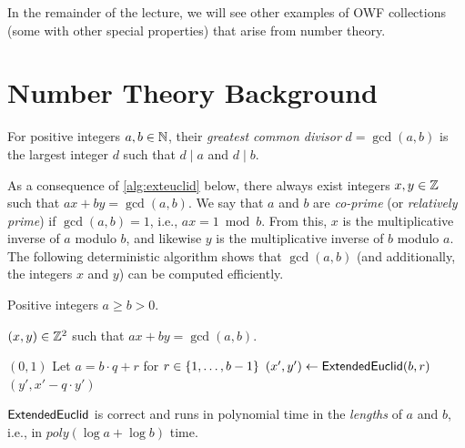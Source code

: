 \documentclass[11pt]{article}
\begin{document}
In the remainder of the lecture, we will see other examples of OWF
collections (some with other special properties) that arise from
number theory.

\section{Number Theory Background}
\label{sec:numb-theory-backgr}

\begin{definition}
   \label{def:gcd}
   For positive integers $a,b \in \mathbb{N}$, their \emph{greatest common
     divisor} $d = \gcd(a,b)$ is the largest integer $d$ such that $d
   \mid a$ and $d \mid b$.
\end{definition}

As a consequence of \cref{alg:exteuclid} below, there always
exist integers $x,y \in \mathbb{Z}$ such that $ax + by = \gcd(a,b)$.  We say
that $a$ and $b$ are \emph{co-prime} (or \emph{relatively prime}) if
$\gcd(a,b) = 1$, i.e., $ax = 1 \bmod b$.  From this, $x$ is the
multiplicative inverse of $a$ modulo $b$, and likewise $y$ is the
multiplicative inverse of $b$ modulo $a$.  The following deterministic
algorithm shows that $\gcd(a,b)$ (and additionally, the integers $x$
and $y$) can be computed efficiently.

\newcommand{\exteuclid}{\algo{ExtendedEuclid}}
\renewcommand{\algorithmicrequire}{\textbf{Input:}}
\renewcommand{\algorithmicensure}{\textbf{Output:}}

\begin{algorithm}
  \caption{Algorithm $\exteuclid(a,b)$ for computing the greatest
    common divisor of $a$ and $b$.}
  \label{alg:exteuclid}

  \begin{algorithmic}[1]
    \REQUIRE Positive integers $a \geq b > 0$.

    \ENSURE $(x,y) \in \mathbb{Z}^{2}$ such that $ax + by = \gcd(a,b)$.

    \RETURN $(0,1)$
    \ELSE
    \STATE Let $a = b \cdot q + r$ for $r \in \{1, \ldots, b-1\}$
    \STATE $(x',y') \gets \exteuclid(b,r)$
    \RETURN $(y', x' - q \cdot y')$
    \ENDIF
  \end{algorithmic}
\end{algorithm}

\begin{theorem}
  \label{thm:exteuclid}
  $\exteuclid$ is correct and runs in polynomial time in the
  \emph{lengths} of $a$ and $b$, i.e., in $poly(\log a + \log b)$
  time.
\end{theorem}
\end{document}
